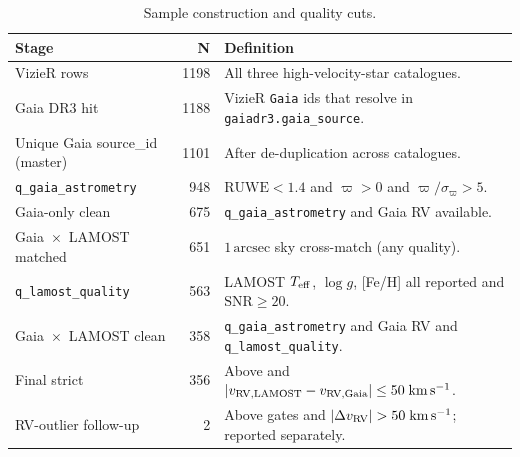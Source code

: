 \begin{table}
\caption{Sample construction and quality cuts.}
\label{tab:funnel}
\begin{tabular}{lrl}
\toprule
Stage & N & Definition \\
\midrule
VizieR rows & 1198 & All three high-velocity-star catalogues. \\
Gaia DR3 hit & 1188 & VizieR \texttt{Gaia} ids that resolve in \texttt{gaiadr3.gaia\_source}. \\
Unique Gaia source\_id (master) & 1101 & After de-duplication across catalogues. \\
\texttt{q\_gaia\_astrometry} & 948 & $\mathrm{RUWE}<1.4$ and $\varpi>0$ and $\varpi/\sigma_{\varpi}>5$. \\
Gaia-only clean & 675 & \texttt{q\_gaia\_astrometry} and Gaia RV available. \\
Gaia~$\times$~LAMOST matched & 651 & $1\,\mathrm{arcsec}$ sky cross-match (any quality). \\
\texttt{q\_lamost\_quality} & 563 & LAMOST $T_{\rm eff}$, $\log g$, [Fe/H] all reported and $\mathrm{SNR}\geq 20$. \\
Gaia~$\times$~LAMOST clean & 358 & \texttt{q\_gaia\_astrometry} and Gaia RV and \texttt{q\_lamost\_quality}. \\
Final strict & 356 & Above and $|v_{\rm RV,LAMOST}-v_{\rm RV,Gaia}|\leq 50\;\mathrm{km\,s^{-1}}$. \\
RV-outlier follow-up & 2 & Above gates and $|\Delta v_{\rm RV}|>50\;\mathrm{km\,s^{-1}}$; reported separately. \\
\bottomrule
\end{tabular}
\end{table}
